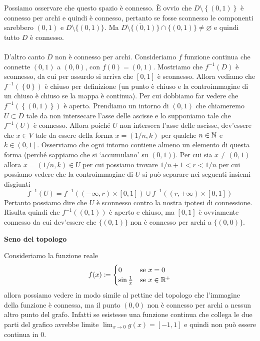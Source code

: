 \begin{remark}
		
		Possiamo osservare che questo spazio è connesso. È ovvio che $D \setminus  \left\{(0,1)\right\}$ è connesso per archi e quindi è connesso, pertanto se fosse sconnesso le componenti sarebbero $(0,1)$ e $D \setminus \{(0,1)\}$. Ma $\overline{D \setminus \{(0,1)\}} \cap \{(0,1)\} \neq \varnothing$ e quindi tutto $D$ è connesso. \\ \\
		D'altro canto $D$ non è connesso per archi. Consideriamo $f$ funzione continua che connette $(0,1)$ a $(0,0)$, con $f(0) = (0,1)$. Mostriamo che $f^{-1}(D)$ è sconnesso, da cui per assurdo si arriva che $\left[0,1\right]$ è sconnesso. Allora vediamo che $f^{-1}(\left\{0\right\})$ è chiuso per definizione (un punto è chiuso e la controimmagine di un chiuso è chiuso se la mappa è continua). Per cui dobbiamo far vedere che $f^{-1}(\left\{(0,1)\right\})$ è aperto. Prendiamo un intorno di $(0,1)$ che chiameremo $U \subset D$ tale da non intersecare l'asse delle ascisse e lo supponiamo tale che $f^{-1}(U)$ è connesso. Allora 
		poiché $U$ non interseca l'asse delle ascisse, dev'essere che $x \in V$ tale da essere della forma $x = (1/n, k)$ per qualche $n \in \mathbb{N}$ e $k \in \left(0,1\right]$. Osserviamo che ogni intorno contiene almeno un elemento di questa forma (perché sappiamo che si `accumulano' su $(0,1)$). Per cui sia $x \neq (0,1)$ allora $x = (1/n, k) \in U$ per cui possiamo trovare $1/n+1< r< 1/n$ per cui possiamo vedere che la controimmagine di $U$ si può separare nei seguenti insiemi disgiunti 
		\begin{equation*}
			f^{-1}(U) = f^{-1}((-\infty, r)\times \left[0,1\right]) \cup f^{-1}((r,+\infty)\times \left[0,1\right])
		\end{equation*}
		Pertanto possiamo dire che $U$ è sconnesso contro la nostra ipotesi di connessione. Risulta quindi che $f^{-1}((0,1))$ è aperto e chiuso, ma $\left[0,1\right]$ è ovviamente connesso da cui dev'essere che $\{(0,1)\}$ non è connesso per archi a $\{(0,0)\}$.\\ 
		
		\begin{flushleft}
			\textbf{Seno del topologo}
		\end{flushleft}
		
		 Consideriamo la funzione reale 
		\begin{equation*}
			f(x) \coloneqq
			\begin{cases}
				0 & \text{se}\ x = 0 \\
				\sin \frac{1}{x} & \text{se}\ x \in \mathbb{R}^+
			\end{cases}
		\end{equation*}
		allora possiamo vedere in modo simile al pettine del topologo che l'immagine della funzione è connessa, ma il punto $(0,0)$ non è connesso per archi a nessun altro punto del grafo. Infatti se esistesse una funzione continua che collega le due parti del grafico avrebbe limite $\lim_{x\to 0} g(x) = \left[-1,1\right]$ e quindi non può essere continua in $0$.
\end{remark}
